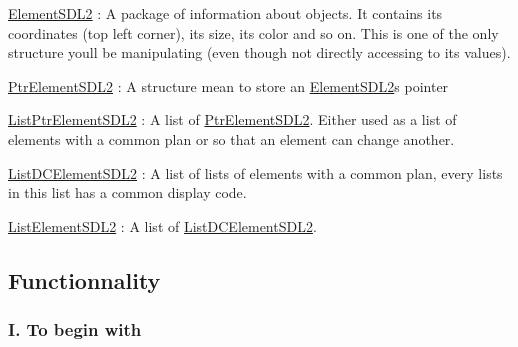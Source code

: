 \begin{DoxyEnumerate}
\item \hyperlink{structElementSDL2}{Element\+S\+D\+L2} \+: A package of information about objects. It contains its coordinates (top left corner), its size, its color and so on. This is one of the only structure you\textquotesingle{}ll be manipulating (even though not directly accessing to its values).
\item \hyperlink{structPtrElementSDL2}{Ptr\+Element\+S\+D\+L2} \+: A structure mean to store an \hyperlink{structElementSDL2}{Element\+S\+D\+L2}\textquotesingle{}s pointer
\item \hyperlink{structListPtrElementSDL2}{List\+Ptr\+Element\+S\+D\+L2} \+: A list of \hyperlink{structPtrElementSDL2}{Ptr\+Element\+S\+D\+L2}. Either used as a list of elements with a common plan or so that an element can change another.
\item \hyperlink{structListDCElementSDL2}{List\+D\+C\+Element\+S\+D\+L2} \+: A list of lists of elements with a common plan, every lists in this list has a common display code.
\item \hyperlink{structListElementSDL2}{List\+Element\+S\+D\+L2} \+: A list of \hyperlink{structListDCElementSDL2}{List\+D\+C\+Element\+S\+D\+L2}.
\end{DoxyEnumerate}

\subsection*{Functionnality}

\subsubsection*{I. To begin with}


